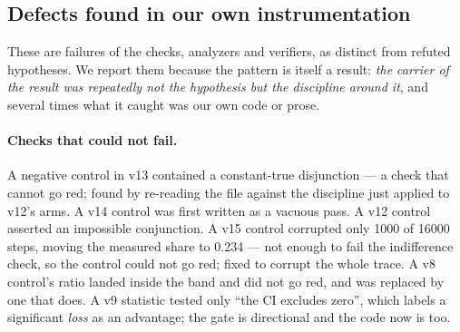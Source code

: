 \documentclass[11pt]{article}
\begin{document}
\subsection{Defects found in our own instrumentation}

These are failures of the checks, analyzers and verifiers, as distinct from refuted
hypotheses. We report them because the pattern is itself a result: \emph{the carrier
of the result was repeatedly not the hypothesis but the discipline around it}, and
several times what it caught was our own code or prose.

\paragraph{Checks that could not fail.} A negative control in v13 contained a
constant-true disjunction --- a check that cannot go red; found by re-reading the file
against the discipline just applied to v12's arms. A v14 control was first written as
a vacuous pass. A v12 control asserted an impossible conjunction. A v15 control
corrupted only 1000 of 16000 steps, moving the measured share to 0.234 --- not enough
to fail the indifference check, so the control could not go red; fixed to corrupt the
whole trace. A v8 control's ratio landed inside the band and did not go red, and was
replaced by one that does. A v9 statistic tested only ``the CI excludes zero'', which
labels a significant \emph{loss} as an advantage; the gate is directional and the code
now is too.
\end{document}
